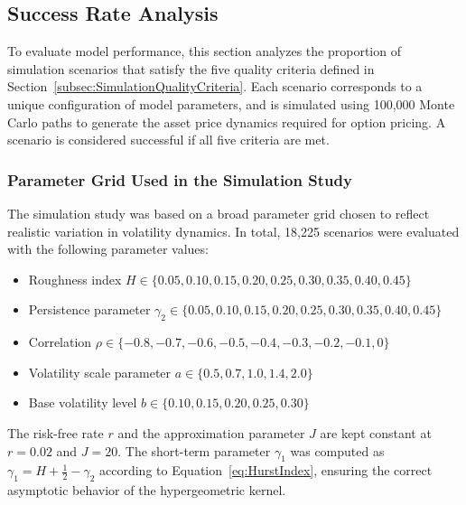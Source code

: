 \subsection{Success Rate Analysis} \label{subsec:SuccessRateAnalysis}

To evaluate model performance, this section analyzes the proportion of simulation scenarios that satisfy the five quality criteria defined in Section~\ref{subsec:SimulationQualityCriteria}. Each scenario corresponds to a unique configuration of model parameters, and is simulated using 100{,}000 Monte Carlo paths to generate the asset price dynamics required for option pricing. A scenario is considered successful if all five criteria are met.

\subsubsection*{Parameter Grid Used in the Simulation Study}
The simulation study was based on a broad parameter grid chosen to reflect realistic variation in volatility dynamics. In total, 18{,}225 scenarios were evaluated with the following parameter values:
\begin{itemize}
    \item Roughness index $H \in \{0.05, 0.10, 0.15, 0.20, 0.25, 0.30, 0.35, 0.40, 0.45\}$
    \item Persistence parameter $\gamma_2 \in \{0.05, 0.10, 0.15, 0.20, 0.25, 0.30, 0.35, 0.40, 0.45\}$
    \item Correlation $\rho \in \{-0.8, -0.7, -0.6, -0.5, -0.4, -0.3, -0.2, -0.1, 0\}$
    \item Volatility scale parameter $a \in \{0.5, 0.7, 1.0, 1.4, 2.0\}$
    \item Base volatility level $b \in \{0.10, 0.15, 0.20, 0.25, 0.30\}$
\end{itemize}
The risk-free rate $r$ and the approximation parameter $J$ are kept constant at $r = 0.02$ and $J = 20$. The short-term parameter $\gamma_1$ was computed as $\gamma_1 = H + \tfrac{1}{2} - \gamma_2$ according to Equation~\eqref{eq:HurstIndex}, ensuring the correct asymptotic behavior of the hypergeometric kernel.

